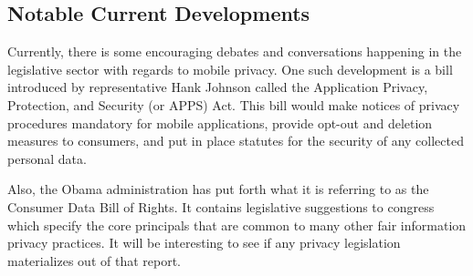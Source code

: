 % 

	\subsection{Notable Current Developments}

Currently, there is some encouraging debates and conversations happening in the legislative sector with regards to mobile privacy. One such development is a bill introduced by representative Hank Johnson called the Application Privacy, Protection, and Security (or APPS) Act. This bill would make notices of privacy procedures mandatory for mobile applications, provide opt-out and deletion measures to consumers, and put in place statutes for the security of any collected personal data\cite{hank}.

Also, the Obama administration has put forth what it is referring to as the Consumer Data Bill of Rights. It contains legislative suggestions to congress which specify the core principals that are common to many other fair information privacy practices\cite{obama}. It will be interesting to see if any privacy legislation materializes out of that report. 
